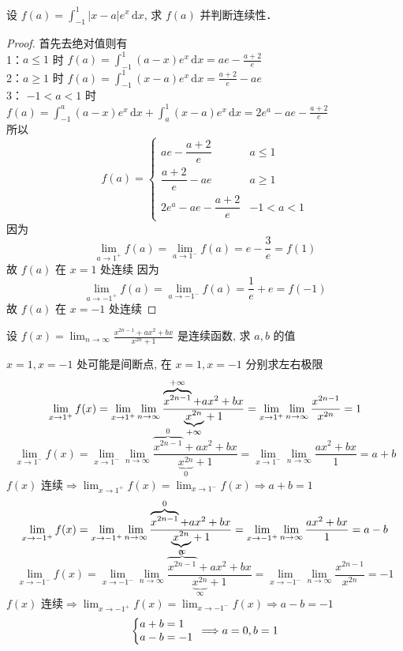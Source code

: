 \documentclass[color=green,titlestyle=hang]{elegantbook}%
\begin{document}
\begin{example}
设 $\displaystyle f(a)=\int_{-1}^{1}|x-a|e^x\,\mathrm{d}x$, 求 $f(a)$ 并判断连续性．	
\end{example}\begin{proof}
首先去绝对值则有\\[1mm]
1：$a\leqslant1$  时 $\displaystyle f(a)=\int_{-1}^{1}(a-x)e^x\,\mathrm{d}x=ae-\frac{a+2}{e}$\\[1mm]
2：$a\geqslant1$  时 $\displaystyle f(a)=\int_{-1}^{1}(x-a)e^x\,\mathrm{d}x=\frac{a+2}{e}-ae$\\[1mm]
3： $-1<a<1$ 时$\displaystyle f(a)=\int_{-1}^{a}(a-x)e^x\,\mathrm{d}x+\int_{a}^{1}(x-a)e^x\,\mathrm{d}x=2e^a-ae-\frac{a+2}{e}$\\[1mm]
所以\begin{equation*}f(a)=\begin{cases}ae-\dfrac{a+2}{e}&a\leqslant1\\[1mm]
\dfrac{a+2}{e}-ae&a\geqslant1\\[1mm]
2e^a-ae-\dfrac{a+2}{e}&-1<a<1
\end{cases}\end{equation*}
因为\begin{equation*}\lim_{a\to1^+}f(a)=\lim_{a\to1^-}f(a)=e-\frac{3}{e}=f(1)\end{equation*}
故 $f(a)$ 在 $x=1$ 处连续
因为\begin{equation*}\lim_{a\to-1^+}f(a)=\lim_{a\to-1^-}f(a)=\frac{1}{e}+e=f(-1)\end{equation*}
故 $f(a)$ 在 $x=-1$ 处连续	
\end{proof}

\begin{example}
设 $f(x)=\lim_{n\to\infty}\frac{x^{2n-1}+ax^2+bx}{x^{2n}+1}$ 是连续函数, 求 $a,b$ 的值
\end{example}\begin{solution} $x=1,x=-1$ 处可能是间断点, 在 $x=1,x=-1$ 分别求左右极限
\[\lim_{x\to1^+}f(x)=\lim_{x\to1^+}\lim_{n\to\infty}\frac{\overbrace{x^{2n-1}}^{+\infty}+ax^2+bx}{\smash{\underbrace{x^{2n}}_{+\infty}}+1}=
\lim_{x\to1^+}\lim_{n\to\infty}\frac{x^{2n-1}}{x^{2n}}=1\]
\[\lim_{x\to1^-}f(x)=\lim_{x\to1^-}\lim_{n\to\infty}\frac{\overbrace{x^{2n-1}}^{0}+ax^2+bx}{\underbrace{x^{2n}}_0+1}=
\lim_{x\to1^-}\lim_{n\to\infty}\frac{ax^2+bx}{1}=a+b\]
$f(x)$ 连续$\Longrightarrow \lim_{x\to1^+}f(x)=\lim_{x\to1^-}f(x)\Longrightarrow a+b=1$
\[\lim_{x\to-1^+}f(x)=\lim_{x\to-1^+}\lim_{n\to\infty}\frac{\overbrace{x^{2n-1}}^0+ax^2+bx}{\smash{\underbrace{x^{2n}}_0}+1}=
\lim_{x\to-1^+}\lim_{n\to\infty}\frac{ax^2+bx}{1}=a-b\]
\[\lim_{x\to-1^-}f(x)=\lim_{x\to-1^-}\lim_{n\to\infty}\frac{\overbrace{x^{2n-1}}^{\infty}+ax^2+bx}{\underbrace{x^{2n}}_{\infty}+1}=
\lim_{x\to-1^-}\lim_{n\to\infty}\frac{x^{2n-1}}{x^{2n}}=-1\]
$f(x)$ 连续$\Longrightarrow \lim_{x\to-1^+}f(x)=\lim_{x\to-1^-}f(x)\Longrightarrow a-b=-1$
\[\bigg\{\begin{array}{@{}l}
a+b=1\\a-b=-1
\end{array}\Longrightarrow a=0,b=1\]
\end{solution}
\end{document}

